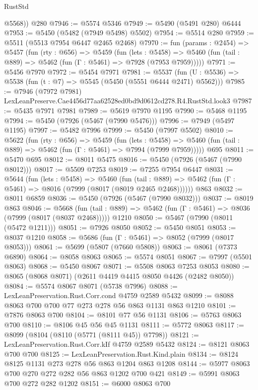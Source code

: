 \begin{lexlean}{RustStd}
\begin{coremodule}
        @5568))
    @280
@7946 := @5574 @5346
@7949 := @5490 (@5491 @280) @6444
@7953 := @5450 (@5482 (@7949 @5498) @5502)
@7954 := @5514 @280
@7959 := @5511 (@5513 @7954 @6447 @2465 @2468)
@7970 := fun (params : @2454) =>
  @5457
    (fun (rty : @656) =>
    @5459
      (fun (lets : @5458) =>
      @5460 (fun (tail : @889) => @5462 (fun (Γ : @5461) => @7928 (@7953 @7959)))))
@7971 := @5456 @7970
@7972 := @5454 @7971
@7981 := @5537 (fun (U : @5536) => @5538 (fun (t : @7) => @5545 (@5450 (@5551 @6444 @2471) @5562)))
@7985 := @7946 (@7972 @7981) LexLeanPreserve.Cae4456d77aa62528ed0bd9d0612cd278.R4.RustStd.look3
@7987 := @5435 @7971 @7981
@7989 := @5619 @7970 @1195
@7990 := @5468 @1195
@7994 := @5450 (@7926 (@5467 (@7990 @5476)))
@7996 := @7949 (@5497 @1195)
@7997 := @5482 @7996
@7999 := @5450 (@7997 @5502)
@8010 := @5622
    (fun (rty : @656) =>
    @5459
      (fun (lets : @5458) =>
      @5460 (fun (tail : @889) => @5462 (fun (Γ : @5461) => @7994 (@7999 @7959)))))
    @695
@8011 := @5470 @695
@8012 := @8011 @5475
@8016 := @5450 (@7926 (@5467 (@7990 @8012)))
@8017 := @5509 @7253
@8019 := @7255 @7954 @6447
@8031 := @5644
    (fun (lets : @5458) =>
    @5460
      (fun (tail : @889) => @5462 (fun (Γ : @5461) => @8016 (@7999 (@8017 (@8019 @2465 @2468))))))
    @863
@8032 := @8011 @6859
@8036 := @5450 (@7926 (@5467 (@7990 @8032)))
@8037 := @8019 @863
@8046 := @5668
    (fun (tail : @889) => @5462 (fun (Γ : @5461) => @8036 (@7999 (@8017 (@8037 @2468)))))
    @1210
@8050 := @5467 (@7990 (@8011 (@5472 @1211)))
@8051 := @7926 @8050
@8052 := @5450 @8051
@8053 := @8037 @1210
@8058 := @5686 (fun (Γ : @5461) => @8052 (@7999 (@8017 @8053)))
@8061 := @5699 (@5807 (@7660 @5808))
@8063 := @8061 (@7373 @6890)
@8064 := @8058 @8063
@8065 := @5574 @8051
@8067 := @7997 (@5501 @8063)
@8068 := @5450 @8067
@8071 := @5508 @8063 @7253 @8053
@8080 := @8065 (@8068 @8071) (@2611 @4419 @4415 @8050 @4426 (@2482 @8050))
@8084 := @5574 @8067 @8071 (@5738 @7996)
@8088 := LexLeanPreservation.Rust.Corr.cond @4759 @2589 @5432
@8099 := @8088 @8063 @700 @700 @77 @273 @278 @56 @863 @1131 @863 @1210
@8101 := @7876 @8063 @700
@8104 := @8101 @77 @56 @1131
@8106 := @5763 @8063 @700
@8110 := @8106 @45 @56 @45 @1131
@8111 := @5772 @8063
@8117 := @8099 (@8104 (@8110 (@5771 (@8111 @45)) @7798))
@8121 := LexLeanPreservation.Rust.Corr.kIf @4759 @2589 @5432
@8124 := @8121 @8063 @700 @700
@8125 := LexLeanPreservation.Rust.Kind.plain
@8134 := @8124 @8125 @1131 @273 @278 @56 @863 @1204 @863 @1208
@8144 := @5977 @8063 @700 @270 @272 @282 @56 @863 @1202 @700 @421
@8149 := @5991 @8063 @700 @272 @282 @1202
@8151 := @6000 @8063 @700

\end{coremodule}
\end{lexlean}
